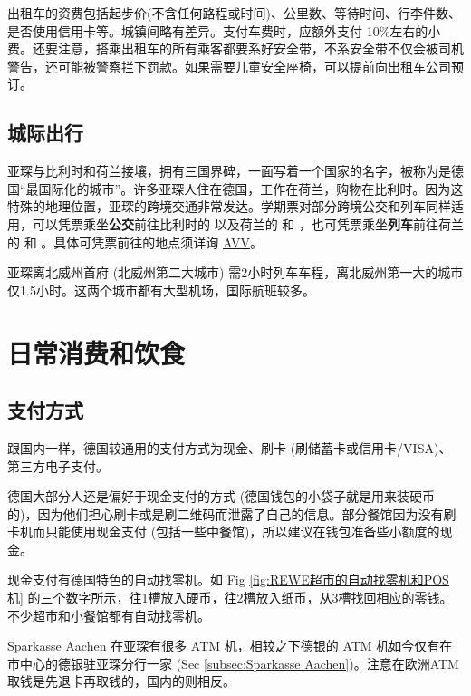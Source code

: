     出租车的资费包括起步价(不含任何路程或时间)、公里数、等待时间、行李件数、是否使用信用卡等。城镇间略有差异。支付车费时，应额外支付 10\%左右的小费。还要注意，搭乘出租车的所有乘客都要系好安全带，不系安全带不仅会被司机警告，还可能被警察拦下罚款。如果需要儿童安全座椅，可以提前向出租车公司预订。

  \subsection{城际出行}\label{subsec:城际出行}

    亚琛与比利时和荷兰接壤，拥有三国界碑，一面写着一个国家的名字，被称为是德国``最国际化的城市''。许多亚琛人住在德国，工作在荷兰，购物在比利时。因为这特殊的地理位置，亚琛的跨境交通非常发达。学期票对部分跨境公交和列车同样适用，可以凭票乘坐\textbf{公交}前往比利时的  以及荷兰的  和 ，也可凭票乘坐\textbf{列车}前往荷兰的  和 。具体可凭票前往的地点须详询 \href{http://www.avv.de/}{AVV}。

    亚琛离北威州首府 (北威州第二大城市) 需2小时列车车程，离北威州第一大的城市仅1.5小时。这两个城市都有大型机场，国际航班较多。

\section{日常消费和饮食}\label{sec:日常消费和饮食}

  \subsection{支付方式}\label{subsec:支付方式}

    跟国内一样，德国较通用的支付方式为现金、刷卡 (刷储蓄卡或信用卡/VISA)、第三方电子支付。

    德国大部分人还是偏好于现金支付的方式 (德国钱包的小袋子就是用来装硬币的)，因为他们担心刷卡或是刷二维码而泄露了自己的信息。部分餐馆因为没有刷卡机而只能使用现金支付 (包括一些中餐馆)，所以建议在钱包准备些小额度的现金。

    现金支付有德国特色的自动找零机。如 Fig \ref{fig:REWE超市的自动找零机和POS机} 的三个数字所示，往1槽放入硬币，往2槽放入纸币，从3槽找回相应的零钱。不少超市和小餐馆都有自动找零机。

    Sparkasse Aachen 在亚琛有很多 ATM 机，相较之下德银的 ATM 机如今仅有在市中心的德银驻亚琛分行一家 (Sec \ref{subsec:Sparkasse Aachen})。注意在欧洲ATM取钱是先退卡再取钱的，国内的则相反。

